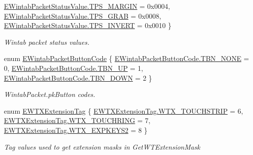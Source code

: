 \begin{DoxyCompactItemize}
\mbox{\hyperlink{namespace_wintab_d_n_afe14d17b83fb34685a298d857c203caca316fc213c5429266093cca277197bc89}{E\+Wintab\+Packet\+Status\+Value.\+T\+P\+S\+\_\+\+M\+A\+R\+G\+IN}} = 0x0004, 
\mbox{\hyperlink{namespace_wintab_d_n_afe14d17b83fb34685a298d857c203caca611f4dc1a636ab77e3bbe6f078fea276}{E\+Wintab\+Packet\+Status\+Value.\+T\+P\+S\+\_\+\+G\+R\+AB}} = 0x0008, 
\newline
\mbox{\hyperlink{namespace_wintab_d_n_afe14d17b83fb34685a298d857c203caca7b360a1118406f2729a1bcc4074ddfdf}{E\+Wintab\+Packet\+Status\+Value.\+T\+P\+S\+\_\+\+I\+N\+V\+E\+RT}} = 0x0010
 \}
\begin{DoxyCompactList}\small\item\em Wintab packet status values. \end{DoxyCompactList}\item 
enum \mbox{\hyperlink{namespace_wintab_d_n_a0829e0e054dd601b4f043415c0090c31}{E\+Wintab\+Packet\+Button\+Code}} \{ \mbox{\hyperlink{namespace_wintab_d_n_a0829e0e054dd601b4f043415c0090c31a925e5d7da57c5c2d7a009cff85eb9d3f}{E\+Wintab\+Packet\+Button\+Code.\+T\+B\+N\+\_\+\+N\+O\+NE}} = 0, 
\mbox{\hyperlink{namespace_wintab_d_n_a0829e0e054dd601b4f043415c0090c31a1ff7e6dd3b84fa37d7db1878e4842df8}{E\+Wintab\+Packet\+Button\+Code.\+T\+B\+N\+\_\+\+UP}} = 1, 
\mbox{\hyperlink{namespace_wintab_d_n_a0829e0e054dd601b4f043415c0090c31a429caf34e990ae37d3686c1b183900d6}{E\+Wintab\+Packet\+Button\+Code.\+T\+B\+N\+\_\+\+D\+O\+WN}} = 2
 \}
\begin{DoxyCompactList}\small\item\em Wintab\+Packet.\+pk\+Button codes. \end{DoxyCompactList}\item 
enum \mbox{\hyperlink{namespace_wintab_d_n_a303ef868b8887dc43872ddac8a7d059b}{E\+W\+T\+X\+Extension\+Tag}} \{ \mbox{\hyperlink{namespace_wintab_d_n_a303ef868b8887dc43872ddac8a7d059baa60d07914907f3b8ea00887b6bb64288}{E\+W\+T\+X\+Extension\+Tag.\+W\+T\+X\+\_\+\+T\+O\+U\+C\+H\+S\+T\+R\+IP}} = 6, 
\mbox{\hyperlink{namespace_wintab_d_n_a303ef868b8887dc43872ddac8a7d059ba54459ba04880b0badafe291a1c10206d}{E\+W\+T\+X\+Extension\+Tag.\+W\+T\+X\+\_\+\+T\+O\+U\+C\+H\+R\+I\+NG}} = 7, 
\mbox{\hyperlink{namespace_wintab_d_n_a303ef868b8887dc43872ddac8a7d059bad58841126978f27c2e58df6c507db6cf}{E\+W\+T\+X\+Extension\+Tag.\+W\+T\+X\+\_\+\+E\+X\+P\+K\+E\+Y\+S2}} = 8
 \}
\begin{DoxyCompactList}\small\item\em Tag values used to get extension masks in Get\+W\+T\+Extension\+Mask \end{DoxyCompactList}\item 

\end{DoxyCompactItemize}
